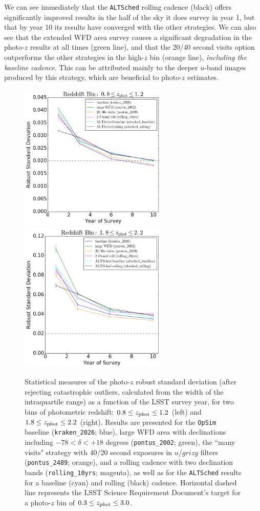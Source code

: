 We can see immediately that the {\tt ALTSched} rolling cadence (black) offers significantly improved results in the half of the sky it does survey in year 1, but that by year 10 its results have converged with the other strategies. We can also see that the extended WFD area survey causes a significant degradation in the photo-$z$ results at all times (green line), and that the 20/40 second visits option outperforms the other strategies in the high-$z$ bin (orange line), {\it including the baseline cadence}. This can be attributed mainly to the deeper $u$-band images produced by this strategy, which are beneficial to photo-$z$ estimates.

\begin{figure}[h]
\begin{center}
\includegraphics[width=7cm,trim={0cm 0cm 0cm 0cm},clip]{figures/zbin1_IQRs.png}
\includegraphics[width=7cm,trim={0cm 0cm 0cm 0cm},clip]{figures/zbin2_IQRs.png}
\caption{Statistical measures of the photo-$z$ robust standard deviation (after rejecting catastrophic outliers, calculated from the width of the intraquartile range) as a function of the LSST survey year, for two bins of photometric redshift: $0.8 \leq z_{\rm phot} \leq 1.2$ (left) and  $1.8 \leq z_{\rm phot} \leq 2.2$ (right). Results are presented for the {\tt OpSim} baseline ({\tt kraken\_2026}; blue), large WFD area with declinations including  $-78<\delta<+18$ degrees ({\tt pontus\_2002}; green), the ``many visits" strategy with 40/20 second exposures in $u$/$grizy$ filters ({\tt pontus\_2489}; orange), and a rolling cadence with two declination bands ({\tt rolling\_10yrs}; magenta), as well as for the {\tt ALTSched} results for a baseline (cyan) and rolling (black) cadence. Horizontal dashed line represents the LSST Science Requirement Document's target for a photo-$z$ bin of $0.3 \leq z_{\rm phot} \leq 3.0$. \label{fig:evol}}
\end{center}
\end{figure}
